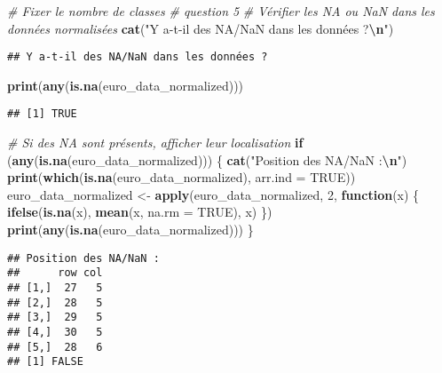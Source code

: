 \documentclass[
]{article}
\newenvironment{Shaded}{\begin{snugshade}}{\end{snugshade}}
\newcommand{\AttributeTok}[1]{\textcolor[rgb]{0.13,0.29,0.53}{#1}}
\newcommand{\CommentTok}[1]{\textcolor[rgb]{0.56,0.35,0.01}{\textit{#1}}}
\newcommand{\ConstantTok}[1]{\textcolor[rgb]{0.56,0.35,0.01}{#1}}
\newcommand{\ControlFlowTok}[1]{\textcolor[rgb]{0.13,0.29,0.53}{\textbf{#1}}}
\newcommand{\DecValTok}[1]{\textcolor[rgb]{0.00,0.00,0.81}{#1}}
\newcommand{\FunctionTok}[1]{\textcolor[rgb]{0.13,0.29,0.53}{\textbf{#1}}}
\newcommand{\NormalTok}[1]{#1}
\newcommand{\OtherTok}[1]{\textcolor[rgb]{0.56,0.35,0.01}{#1}}
\newcommand{\SpecialCharTok}[1]{\textcolor[rgb]{0.81,0.36,0.00}{\textbf{#1}}}
\newcommand{\StringTok}[1]{\textcolor[rgb]{0.31,0.60,0.02}{#1}}
\begin{document}
\begin{Shaded}
\begin{Highlighting}[]
\CommentTok{\# Fixer le nombre de classes}
\CommentTok{\# question 5 }
\CommentTok{\# Vérifier les NA ou NaN dans les données normalisées}
\FunctionTok{cat}\NormalTok{(}\StringTok{"Y a{-}t{-}il des NA/NaN dans les données ?}\SpecialCharTok{\textbackslash{}n}\StringTok{"}\NormalTok{)}
\end{Highlighting}
\end{Shaded}

\begin{verbatim}
## Y a-t-il des NA/NaN dans les données ?
\end{verbatim}

\begin{Shaded}
\begin{Highlighting}[]
\FunctionTok{print}\NormalTok{(}\FunctionTok{any}\NormalTok{(}\FunctionTok{is.na}\NormalTok{(euro\_data\_normalized)))}
\end{Highlighting}
\end{Shaded}

\begin{verbatim}
## [1] TRUE
\end{verbatim}

\begin{Shaded}
\begin{Highlighting}[]
\CommentTok{\# Si des NA sont présents, afficher leur localisation}
\ControlFlowTok{if}\NormalTok{ (}\FunctionTok{any}\NormalTok{(}\FunctionTok{is.na}\NormalTok{(euro\_data\_normalized))) \{}
  \FunctionTok{cat}\NormalTok{(}\StringTok{"Position des NA/NaN :}\SpecialCharTok{\textbackslash{}n}\StringTok{"}\NormalTok{)}
  \FunctionTok{print}\NormalTok{(}\FunctionTok{which}\NormalTok{(}\FunctionTok{is.na}\NormalTok{(euro\_data\_normalized), }\AttributeTok{arr.ind =} \ConstantTok{TRUE}\NormalTok{))}
\NormalTok{  euro\_data\_normalized }\OtherTok{\textless{}{-}} \FunctionTok{apply}\NormalTok{(euro\_data\_normalized, }\DecValTok{2}\NormalTok{, }\ControlFlowTok{function}\NormalTok{(x) \{}
  \FunctionTok{ifelse}\NormalTok{(}\FunctionTok{is.na}\NormalTok{(x), }\FunctionTok{mean}\NormalTok{(x, }\AttributeTok{na.rm =} \ConstantTok{TRUE}\NormalTok{), x)}
\NormalTok{\})}
\FunctionTok{print}\NormalTok{(}\FunctionTok{any}\NormalTok{(}\FunctionTok{is.na}\NormalTok{(euro\_data\_normalized)))}
\NormalTok{\}}
\end{Highlighting}
\end{Shaded}

\begin{verbatim}
## Position des NA/NaN :
##      row col
## [1,]  27   5
## [2,]  28   5
## [3,]  29   5
## [4,]  30   5
## [5,]  28   6
## [1] FALSE
\end{verbatim}
\end{document}
